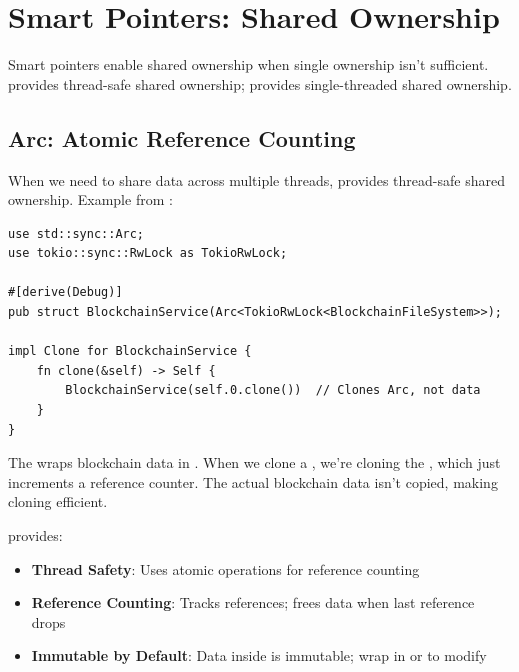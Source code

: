 \section{Smart Pointers: Shared Ownership}
\label{sec:ch24-smart-pointers}

Smart pointers enable shared ownership when single ownership isn't sufficient.  provides thread-safe shared ownership;  provides single-threaded shared ownership.

\subsection{Arc: Atomic Reference Counting}
\label{subsec:ch24-arc}

When we need to share data across multiple threads,  provides thread-safe shared ownership. Example from :

\begin{listing}[htbp]
\caption{Arc for thread-safe shared ownership}
\label{lst:ch24-arc}
\begin{verbatim}
use std::sync::Arc;
use tokio::sync::RwLock as TokioRwLock;

#[derive(Debug)]
pub struct BlockchainService(Arc<TokioRwLock<BlockchainFileSystem>>);

impl Clone for BlockchainService {
    fn clone(&self) -> Self {
        BlockchainService(self.0.clone())  // Clones Arc, not data
    }
}
\end{verbatim}
\end{listing}

The  wraps blockchain data in . When we clone a , we're cloning the , which just increments a reference counter. The actual blockchain data isn't copied, making cloning efficient.

 provides:
\begin{itemize}
  \item \textbf{Thread Safety}: Uses atomic operations for reference counting
  \item \textbf{Reference Counting}: Tracks references; frees data when last reference drops
  \item \textbf{Immutable by Default}: Data inside  is immutable; wrap in  or  to modify
\end{itemize}

